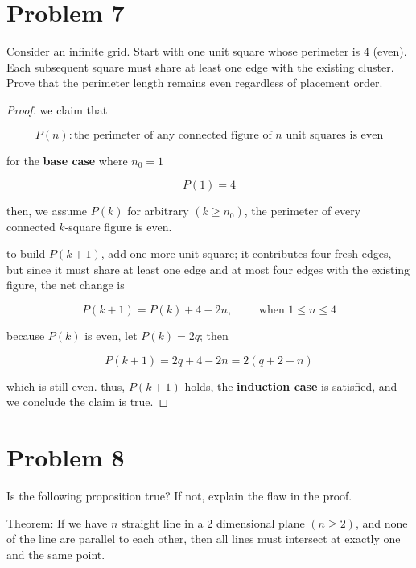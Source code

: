 \section*{Problem 7}
Consider an infinite grid. Start with one unit square whose perimeter is 4 (even). Each subsequent square must share at least one edge with the existing cluster. Prove that the perimeter length remains even regardless of placement order.

\medskip
\solution

\begin{proof}
    
we claim that

\[
P(n) : \text{the perimeter of any connected figure of } n \text{ unit
squares is even}
\]

for the \textbf{base case} where $n_0 = 1$

\[
P(1) = 4
\]

then, we assume $P(k)$ for arbitrary $(k \ge n_0)$, the perimeter of
every connected $k$-square figure is even. 

\vspace{1em}
to build $P(k+1)$, add one more
unit square; it contributes four fresh edges, but since it must share at
least one edge and at most four edges with the existing figure, the net
change is

\[
P(k+1) = P(k) + 4 - 2n, \qquad \text{ when } 1 \le n \le 4
\]

because $P(k)$ is even, let $P(k) = 2q$; then

\[
P(k+1) = 2q + 4 - 2n = 2(q + 2 - n)
\]

which is still even. thus, $P(k+1)$ holds, the \textbf{induction case} is
satisfied, and we conclude the claim is true.
\end{proof}

\vspace{1em}
\hrulefill

\section*{Problem 8}
Is the following proposition true? If not, explain the flaw in the proof.

\vspace{1em}

Theorem: If we have $n$ straight line in a 2 dimensional plane $(n \ge
2)$, and none of the line are parallel to each other, then all lines must
intersect at exactly one and the same point. 

\vspace{1em}

